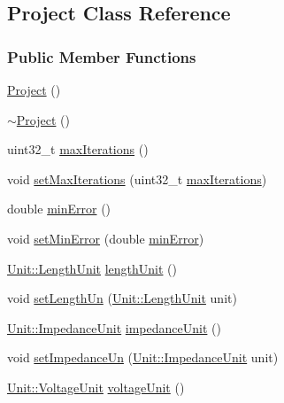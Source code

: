 \hypertarget{class_project}{}\subsection{Project Class Reference}
\label{class_project}
\subsubsection*{Public Member Functions}
\begin{DoxyCompactItemize}
\item 
\hyperlink{class_project_aa007ecd17d5bc800e7a956cf666eea21}{Project} ()
\item 
\hyperlink{class_project_ad165d61b76ee86ee9c27fd987a2a7b9e}{$\sim$\+Project} ()
\item 
uint32\+\_\+t \hyperlink{class_project_ab9d6426396a75f2fcaeadcddcd0fac64}{max\+Iterations} ()
\item 
void \hyperlink{class_project_af2046a5d542d3e3dd51cb9cb04604e8f}{set\+Max\+Iterations} (uint32\+\_\+t \hyperlink{class_project_ab9d6426396a75f2fcaeadcddcd0fac64}{max\+Iterations})
\item 
double \hyperlink{class_project_a457ed8d3b0ea5816f928977509f69a34}{min\+Error} ()
\item 
void \hyperlink{class_project_a2cb776c39adb42a1113bf7887d0d4636}{set\+Min\+Error} (double \hyperlink{class_project_a457ed8d3b0ea5816f928977509f69a34}{min\+Error})
\item 
\hyperlink{class_unit_a8c8921f7b225ad6063b1cb573425b9a0}{Unit\+::\+Length\+Unit} \hyperlink{class_project_a40cd2f59a4a708897e5997942c046f4d}{length\+Unit} ()
\item 
void \hyperlink{class_project_a846ee2284b0856d461b35d78d9f8e1d6}{set\+Length\+Un} (\hyperlink{class_unit_a8c8921f7b225ad6063b1cb573425b9a0}{Unit\+::\+Length\+Unit} unit)
\item 
\hyperlink{class_unit_a3747e779c805df24a71961290be3fbdf}{Unit\+::\+Impedance\+Unit} \hyperlink{class_project_ad0725b9aa4445dd6d21d4e15df482d3b}{impedance\+Unit} ()
\item 
void \hyperlink{class_project_a995d050781923522ae2a02728346d199}{set\+Impedance\+Un} (\hyperlink{class_unit_a3747e779c805df24a71961290be3fbdf}{Unit\+::\+Impedance\+Unit} unit)
\item 
\hyperlink{class_unit_a55b07dfa9457e1eca2c7194fe0cfc3c1}{Unit\+::\+Voltage\+Unit} \hyperlink{class_project_a93b928093072ba15c24693b03a934e4e}{voltage\+Unit} ()
\item 

\end{DoxyCompactItemize}
